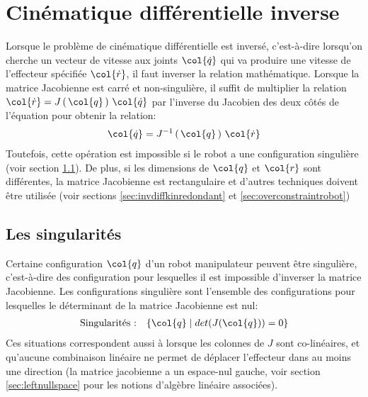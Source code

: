 \newpage
\section{Cinématique différentielle inverse}

Lorsque le problème de cinématique différentielle est inversé, c'est-à-dire lorsqu'on cherche un vecteur de vitesse aux joints $\col{\dot{q}}$ qui va produire une vitesse de l'effecteur spécifiée $\col{\dot{r}}$, il faut inverser la relation mathématique. Lorsque la matrice Jacobienne est carré et non-singulière, il suffit de multiplier la relation $\col{\dot{r}} = J\left( \, \col{q} \, \right) \, \col{\dot{q}}$ par l'inverse du Jacobien des deux côtés de l'équation pour obtenir la relation:
%
\begin{align}
\col{\dot{q}} = J^{-1}\left( \, \col{q} \, \right) \, \col{\dot{r}}
\end{align} 
%
Toutefois, cette opération est impossible si le robot a une configuration singulière (voir section \ref{sec:singu}). De plus, si les dimensions de $\col{q}$ et $\col{r}$ sont différentes, la matrice Jacobienne est rectangulaire et d'autres techniques doivent être utilisée (voir sections \ref{sec:invdiffkinredondant} et \ref{sec:overconstraintrobot})



\subsection{Les singularités}
\label{sec:singu}
Certaine configuration $\col{q}$ d'un robot manipulateur peuvent être singulière, c'est-à-dire des configuration pour lesquelles il est impossible d'inverser la matrice Jacobienne. Les configurations singulière sont l'ensemble des configurations pour lesquelles le déterminant de la matrice Jacobienne est nul:
\begin{align}
\text{Singularités :} \quad \{  \col{q} \; | \; det(J(\col{q})) = 0 \}
\end{align} 
Ces situations correspondent aussi à lorsque les colonnes de $J$ sont co-linéaires, et qu'aucune combinaison linéaire ne permet de déplacer l'effecteur dans au moins une direction (la matrice jacobienne a un espace-nul gauche, voir section \ref{sec:leftnullspace} pour les notions d'algèbre linéaire associées). 


